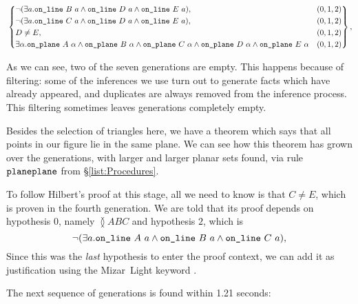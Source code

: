 {\begin{minipage}{\linewidth}
\begin{displaymath}
\begin{split}
    &\left\{\begin{aligned}
        &\Triangle{a}{B}{D}{E}, & (0,1,2)\\
        &\Triangle{a}{C}{D}{E}, & (0,1,2)\\
        &D\neq E, & (0,1,2)\\
      &\exists \alpha. \code{on\_plane}\ A\ \alpha\wedge \code{on\_plane}\ B\ \alpha\wedge \code{on\_plane}\ C\ \alpha\wedge\code{on\_plane}\ D\ \alpha\wedge\code{on\_plane}\ E\ \alpha & (0,1,2)
    \end{aligned}\right\},\\
\end{split}
\end{displaymath}
\end{minipage}}
\linebreak

As we can see, two of the seven generations are empty. This happens because of filtering: some of the inferences we use turn out to generate facts which have already appeared, and duplicates are always removed from the inference process. This filtering sometimes leaves generations completely empty. 

Besides the selection of triangles here, we have a theorem which says that all points in our figure lie in the same plane. We can see how this theorem has grown over the generations, with larger and larger planar sets found, via rule~$\texttt{planeplane}$ from \S\ref{list:Procedures}. 

To follow Hilbert's proof at this stage, all we need to know is that $C\neq E$, which is proven in the fourth generation. We are told that its proof depends on hypothesis $0$, namely $\between{A}{B}{C}$ and hypothesis $2$, which is 
\begin{displaymath}
\neg(\exists a.\texttt{on\_line}\ A\ a\wedge \texttt{on\_line}\ B\ a\wedge \texttt{on\_line}\ C\ a),
\end{displaymath}
Since this was the \emph{last} hypothesis to enter the proof context, we can add it as justification using the Mizar~Light keyword .

\linebreak

The next sequence of generations is found within 1.21 seconds:

